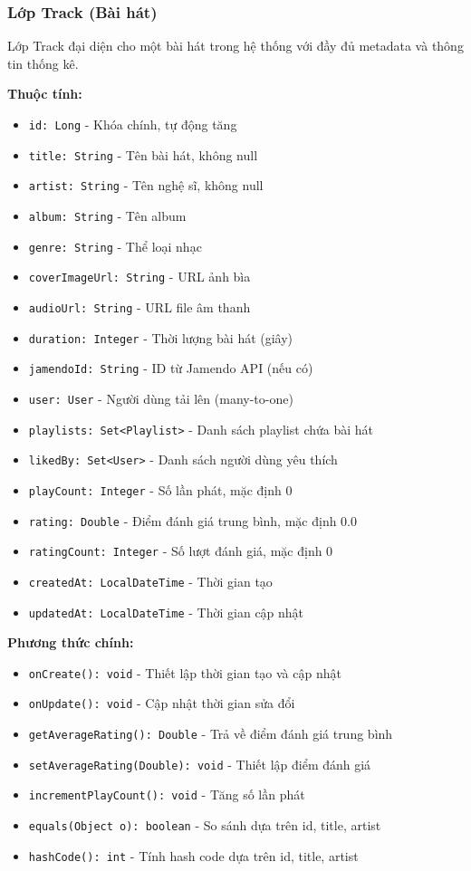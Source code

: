 \subsubsection{Lớp Track (Bài hát)}

Lớp Track đại diện cho một bài hát trong hệ thống với đầy đủ metadata và thông tin thống kê.

\textbf{Thuộc tính:}
\begin{itemize}
    \item \texttt{id: Long} - Khóa chính, tự động tăng
    \item \texttt{title: String} - Tên bài hát, không null
    \item \texttt{artist: String} - Tên nghệ sĩ, không null
    \item \texttt{album: String} - Tên album
    \item \texttt{genre: String} - Thể loại nhạc
    \item \texttt{coverImageUrl: String} - URL ảnh bìa
    \item \texttt{audioUrl: String} - URL file âm thanh
    \item \texttt{duration: Integer} - Thời lượng bài hát (giây)
    \item \texttt{jamendoId: String} - ID từ Jamendo API (nếu có)
    \item \texttt{user: User} - Người dùng tải lên (many-to-one)
    \item \texttt{playlists: Set<Playlist>} - Danh sách playlist chứa bài hát
    \item \texttt{likedBy: Set<User>} - Danh sách người dùng yêu thích
    \item \texttt{playCount: Integer} - Số lần phát, mặc định 0
    \item \texttt{rating: Double} - Điểm đánh giá trung bình, mặc định 0.0
    \item \texttt{ratingCount: Integer} - Số lượt đánh giá, mặc định 0
    \item \texttt{createdAt: LocalDateTime} - Thời gian tạo
    \item \texttt{updatedAt: LocalDateTime} - Thời gian cập nhật
\end{itemize}

\textbf{Phương thức chính:}
\begin{itemize}
    \item \texttt{onCreate(): void} - Thiết lập thời gian tạo và cập nhật
    \item \texttt{onUpdate(): void} - Cập nhật thời gian sửa đổi
    \item \texttt{getAverageRating(): Double} - Trả về điểm đánh giá trung bình
    \item \texttt{setAverageRating(Double): void} - Thiết lập điểm đánh giá
    \item \texttt{incrementPlayCount(): void} - Tăng số lần phát
    \item \texttt{equals(Object o): boolean} - So sánh dựa trên id, title, artist
    \item \texttt{hashCode(): int} - Tính hash code dựa trên id, title, artist
\end{itemize}

